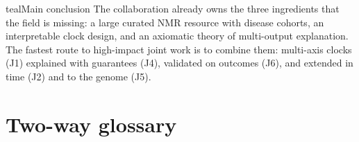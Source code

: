 \documentclass[11pt,a4paper]{article}
\newenvironment{conclusion}{\begin{callout}{teal}{Main conclusion}}{\end{callout}}
\theoremstyle{plain}
\theoremstyle{definition}
\theoremstyle{remark}
\begin{document}
\begin{conclusion}
The collaboration already owns the three ingredients that the field is missing: a large curated NMR resource with disease cohorts, an interpretable clock design, and an axiomatic theory of multi-output explanation. The fastest route to high-impact joint work is to combine them: multi-axis clocks (J1) explained with guarantees (J4), validated on outcomes (J6), and extended in time (J2) and to the genome (J5).
\end{conclusion}

\appendix
\section{Two-way glossary}
\label{app:glossary}
\end{document}
